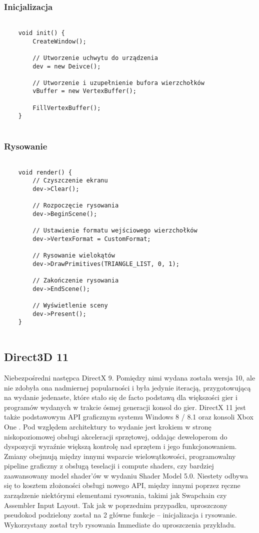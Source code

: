 \subsubsection{Inicjalizacja}
\begin{lstlisting}
	
	void init() {
		CreateWindow();
		
		// Utworzenie uchwytu do urządzenia
		dev = new Deivce();
		
		// Utworzenie i uzupełnienie bufora wierzchołków
		vBuffer = new VertexBuffer();
		
		FillVertexBuffer();
	}
	
\end{lstlisting}

\subsubsection{Rysowanie}
\begin{lstlisting}
	
	void render() {
		// Czyszczenie ekranu
		dev->Clear();
		
		// Rozpoczęcie rysowania
		dev->BeginScene();
		
		// Ustawienie formatu wejściowego wierzchołków
		dev->VertexFormat = CustomFormat;
		
		// Rysowanie wielokątów
		dev->DrawPrimitives(TRIANGLE_LIST, 0, 1);
		
		// Zakończenie rysowania
		dev->EndScene();
		
		// Wyświetlenie sceny
		dev->Present();
	}
	
\end{lstlisting}

\subsection{Direct3D 11}

Niebezpośredni następca DirectX 9. Pomiędzy nimi wydana została wersja
10, ale nie zdobyła ona nadmiernej popularności i była jedynie iteracją,
przygotowującą na wydanie jedenaste, które stało się de facto podstawą
dla większości gier i programów wydanych w trakcie ósmej generacji
konsol do gier. DirectX 11 jest także podstawowym API graficznym systemu
Windows 8 / 8.1 oraz konsoli Xbox One \cite{ms:raisingbar:2024}. Pod względem architektury to wydanie jest krokiem w stronę
niskopoziomowej obsługi akceleracji sprzętowej, oddając deweloperom do
dyspozycji wyraźnie większą kontrolę nad sprzętem i jego
funkcjonowaniem. Zmiany obejmują między innymi wsparcie wielowątkowości,
programowalny pipeline graficzny z obsługą teselacji i compute shaders,
czy bardziej zaawansowany model shader'ów w wydaniu Shader Model 5.0. Niestety odbywa się to kosztem złożoności obsługi nowego API, między
innymi poprzez ręczne zarządzenie niektórymi elementami rysowania,
takimi jak Swapchain czy Assembler Input Layout. Tak jak w poprzednim przypadku, uproszczony pseudokod podzielony został
na 2 główne funkcje -- inicjalizacja i rysowanie. Wykorzystany został
tryb rysowania Immediate do uproszczenia przykładu.


